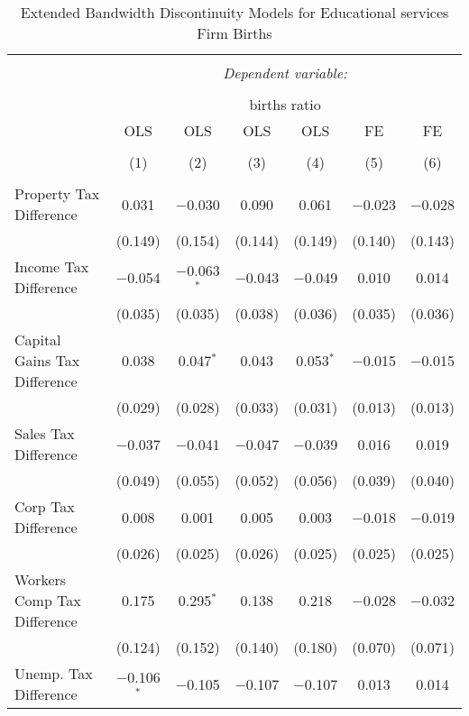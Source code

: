 
\begin{table}[!htbp] \centering 
  \caption{Extended Bandwidth Discontinuity Models for  Educational services Firm Births} 
  \label{61eb} 
\footnotesize 
\begin{tabular}{@{\extracolsep{5pt}}lcccccc} 
\\[-1.8ex]\hline 
\hline \\[-1.8ex] 
 & \multicolumn{6}{c}{\textit{Dependent variable:}} \\ 
\cline{2-7} 
\\[-1.8ex] & \multicolumn{6}{c}{births ratio} \\ 
 & OLS & OLS & OLS & OLS & FE & FE \\ 
\\[-1.8ex] & (1) & (2) & (3) & (4) & (5) & (6)\\ 
\hline \\[-1.8ex] 
 Property Tax Difference & 0.031 & $-$0.030 & 0.090 & 0.061 & $-$0.023 & $-$0.028 \\ 
  & (0.149) & (0.154) & (0.144) & (0.149) & (0.140) & (0.143) \\ 
  Income Tax Difference & $-$0.054 & $-$0.063$^{*}$ & $-$0.043 & $-$0.049 & 0.010 & 0.014 \\ 
  & (0.035) & (0.035) & (0.038) & (0.036) & (0.035) & (0.036) \\ 
  Capital Gains Tax Difference & 0.038 & 0.047$^{*}$ & 0.043 & 0.053$^{*}$ & $-$0.015 & $-$0.015 \\ 
  & (0.029) & (0.028) & (0.033) & (0.031) & (0.013) & (0.013) \\ 
  Sales Tax Difference & $-$0.037 & $-$0.041 & $-$0.047 & $-$0.039 & 0.016 & 0.019 \\ 
  & (0.049) & (0.055) & (0.052) & (0.056) & (0.039) & (0.040) \\ 
  Corp Tax Difference & 0.008 & 0.001 & 0.005 & 0.003 & $-$0.018 & $-$0.019 \\ 
  & (0.026) & (0.025) & (0.026) & (0.025) & (0.025) & (0.025) \\ 
  Workers Comp Tax Difference & 0.175 & 0.295$^{*}$ & 0.138 & 0.218 & $-$0.028 & $-$0.032 \\ 
  & (0.124) & (0.152) & (0.140) & (0.180) & (0.070) & (0.071) \\ 
  Unemp. Tax Difference & $-$0.106$^{*}$ & $-$0.105 & $-$0.107 & $-$0.107 & 0.013 & 0.014 \\ 

\end{tabular}
\end{table}
